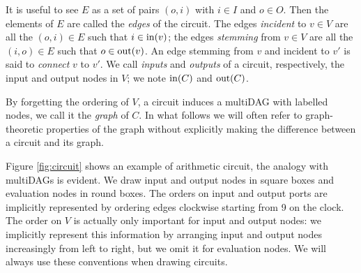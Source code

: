 It is useful to see $E$ as a set of pairs $(o,i)$ with $i\in I$ and
$o\in O$. Then the elements of $E$ are called the \emph{edges} of the
circuit. The edges \emph{incident} to $v\in V$ are all the $(o,i)\in
E$ such that $i\in\operatorname{in}(v)$; the edges \emph{stemming} from $v\in V$
are all the $(i,o)\in E$ such that $o\in\operatorname{out}(v)$. An edge stemming
from $v$ and incident to $v'$ is said to \emph{connect} $v$ to $v'$.
We call \emph{inputs} and \emph{outputs} of a circuit, respectively,
the input and output nodes in $V$; we note $\operatorname{in}(C)$ and $\operatorname{out}(C)$.

By forgetting the ordering of $V$, a circuit induces a multiDAG with
labelled nodes, we call it the \emph{graph} of $C$. In what follows we
will often refer to graph-theoretic properties of the graph without
explicitly making the difference between a circuit and its graph.

Figure \ref{fig:circuit} shows an example of arithmetic circuit, the
analogy with multiDAGs is evident. We draw input and output nodes in
square boxes and evaluation nodes in round boxes. The orders on input
and output ports are implicitly represented by ordering edges
clockwise starting from 9 on the clock. The order on $V$ is actually
only important for input and output nodes: we implicitly represent
this information by arranging input and output nodes increasingly from
left to right, but we omit it for evaluation nodes. We will always use
these conventions when drawing circuits.

